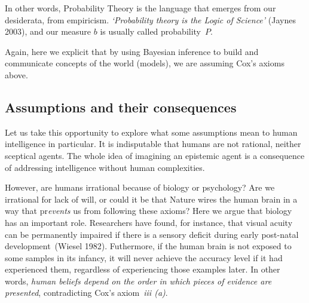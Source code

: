 \documentclass[
  letterpaper,
  12pt,
  british]{tufte-book}
\theoremstyle{plain}
\theoremstyle{definition}
\theoremstyle{plain}
\theoremstyle{remark}
\begin{document}
In other words, Probability Theory is the language that emerges from our
desiderata, from empiricism. \emph{`Probability theory is the Logic of
Science'} (Jaynes
2003),
and our measure \(b\) is usually called probability~\(P\).

Again, here we explicit that by using Bayesian inference to build and
communicate concepts of the world (models), we are assuming Cox's axioms
above.

\hypertarget{assumptions-and-their-consequences}{%
\subsection{Assumptions and their
consequences}\label{assumptions-and-their-consequences}}

Let us take this opportunity to explore what some assumptions mean to
human intelligence in particular. It is indisputable that humans are not rational, neither sceptical
agents. The whole idea of imagining an epistemic agent is a consequence
of addressing intelligence without human complexities.

However, are humans irrational because of biology or psychology? Are we
irrational for lack of will, or could it be that Nature wires the human
brain in a way that pr\emph{events} us from following these axioms? Here
we argue that biology has an important role. Researchers have found, for
instance, that visual acuity can be permanently impaired if there is a
sensory deficit during early post-natal development~(Wiesel
1982).
Futhermore, if the human brain is not exposed to some samples in its
infancy, it will never achieve the accuracy level if it had experienced
them, regardless of experiencing those examples later. In other words,
\emph{human beliefs depend on the order in which pieces of evidence are
presented}, contradicting Cox's axiom~\emph{iii (a)}.
\end{document}
